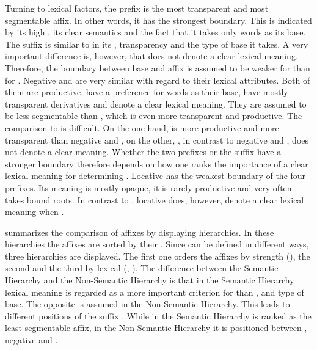 Turning to lexical factors, the prefix  is the most transparent and most segmentable affix. In other words, it has the strongest boundary. This is indicated by its high , its clear semantics and the fact that it takes only words as its base. The suffix  is similar to  in its , transparency and the type of base it takes. A very important difference is, however, that  does not denote a clear lexical meaning. Therefore, the boundary between base and affix is assumed to be weaker for  than for  . 
Negative  and  are very similar with regard to their lexical attributes. Both of them are productive, have a preference for words as their base, have mostly transparent derivatives and denote a clear lexical meaning. They are assumed to be less segmentable than , which is even more transparent and productive. The comparison to  is difficult. On the one hand,  is more productive and more transparent than negative  and , on the other, , in contrast to negative  and , does not denote a clear meaning. Whether the two prefixes or the suffix have a stronger boundary therefore depends on how one ranks the importance of a clear lexical meaning for determining . Locative  has the weakest boundary of the four prefixes. Its meaning is mostly opaque, it is rarely productive and very often takes bound roots. In contrast to , locative  does, however, denote a clear lexical meaning when .


 summarizes the comparison of affixes by displaying  hierarchies. In these  hierarchies the affixes are sorted by their . Since  can be defined in different ways, three hierarchies are displayed. The first one orders the affixes by  strength (), the second and the third by lexical  (, ). The difference between the {Semantic Hierarchy} and the {Non-Semantic Hierarchy} is that in the {Semantic Hierarchy}  lexical meaning is regarded as a more important criterion for  than ,  and type of base. The opposite is assumed in the {Non-Semantic Hierarchy}. This leads to different positions of the suffix . While in the {Semantic Hierarchy}  is ranked as the least segmentable affix, in the {Non-Semantic Hierarchy} it is positioned between , negative  and .

